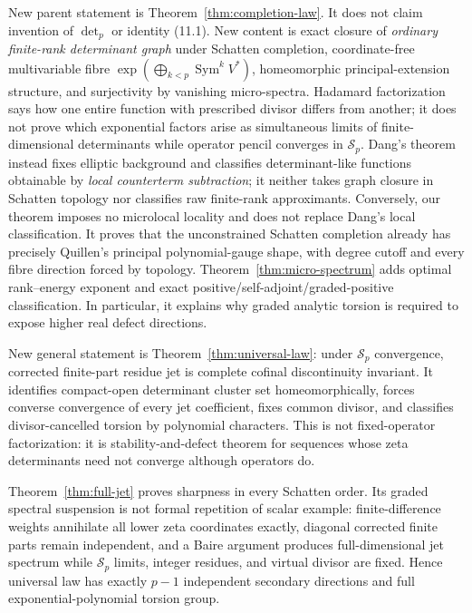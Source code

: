 \documentclass[11pt]{article}
\theoremstyle{definition}
\theoremstyle{remark}
\begin{document}
New parent statement is Theorem~\ref{thm:completion-law}.  It does not claim invention of
$\det_p$ or identity (11.1).  New content is exact closure of \emph{ordinary finite-rank
determinant graph} under Schatten completion, coordinate-free multivariable fibre
$\exp(\bigoplus_{k<p}\operatorname{Sym}^kV^*)$, homeomorphic principal-extension structure, and
surjectivity by vanishing micro-spectra.  Hadamard factorization says how one entire function
with prescribed divisor differs from another; it does not prove which exponential factors arise
as simultaneous limits of finite-dimensional determinants while operator pencil converges in
$\mathcal S_p$.  Dang's theorem instead fixes elliptic background and classifies determinant-like
functions obtainable by \emph{local counterterm subtraction}; it neither takes graph closure in
Schatten topology nor classifies raw finite-rank approximants.  Conversely, our theorem imposes
no microlocal locality and does not replace Dang's local classification.  It proves that the
unconstrained Schatten completion already has precisely Quillen's principal polynomial-gauge
shape, with degree cutoff and every fibre direction forced by topology.
Theorem~\ref{thm:micro-spectrum} adds optimal rank--energy exponent and exact
positive/self-adjoint/graded-positive classification.  In particular, it explains why graded
analytic torsion is required to expose higher real defect directions.

New general statement is Theorem~\ref{thm:universal-law}: under $\mathcal S_p$ convergence,
corrected finite-part residue jet is complete cofinal discontinuity invariant.  It identifies
compact-open determinant cluster set homeomorphically, forces converse convergence of every jet
coefficient, fixes common divisor, and classifies divisor-cancelled torsion by polynomial
characters.  This is not fixed-operator factorization: it is stability-and-defect theorem for
sequences whose zeta determinants need not converge although operators do.

Theorem~\ref{thm:full-jet} proves sharpness in every Schatten order.  Its graded spectral
suspension is not formal repetition of scalar example: finite-difference weights annihilate all
lower zeta coordinates exactly, diagonal corrected finite parts remain independent, and a Baire
argument produces full-dimensional jet spectrum while $\mathcal S_p$ limits, integer residues,
and virtual divisor are fixed.  Hence universal law has exactly $p-1$ independent secondary
directions and full exponential-polynomial torsion group.
\end{document}
